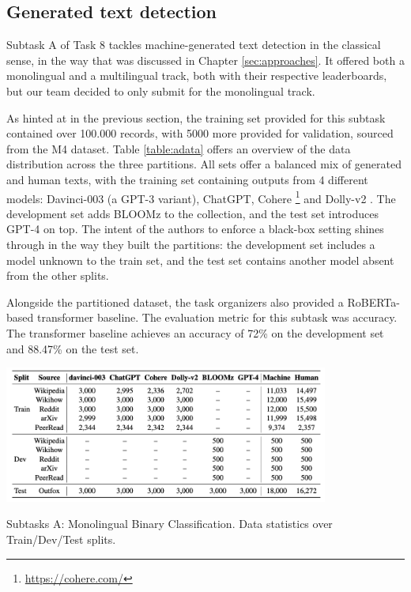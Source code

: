 \subsection{Generated text detection}
\label{subsec:subtask_a}

Subtask A of Task 8 tackles machine-generated text detection in the classical sense, in the way that was discussed in Chapter \ref{sec:approaches}.
It offered both a monolingual and a multilingual track, both with their respective leaderboards, but our team decided to only submit for the monolingual track.

As hinted at in the previous section, the training set provided for this subtask contained over 100.000 records, with 5000 more provided for validation, sourced from the M4 \citep{wang-etal-2024-m4} dataset.
Table \ref{table:adata} offers an overview of the data distribution across the three partitions.
All sets offer a balanced mix of generated and human texts, with the training set containing outputs from 4 different models: Davinci-003 (a GPT-3 variant), ChatGPT, Cohere \footnote{\url{https://cohere.com/}} and Dolly-v2 \citep{DatabricksBlog2023DollyV2}. The development set adds BLOOMz \citep{muennighoff2023crosslingualgeneralizationmultitaskfinetuning} to the collection, and the test set introduces GPT-4 on top.
The intent of the authors to enforce a black-box setting shines through in the way they built the partitions: the development set includes a model unknown to the train set, and the test set contains another model absent from the other splits.

Alongside the partitioned dataset, the task organizers also provided a RoBERTa-based transformer baseline.
The evaluation metric for this subtask was accuracy.
The transformer baseline achieves an accuracy of 72\% on the development set and 88.47\% on the test set.

\begin{table}[ht]
    \centering
    \includegraphics[width=0.8\textwidth]{assets/subtaska-data.png}
    \caption{Subtasks A: Monolingual Binary Classification. Data statistics over Train/Dev/Test splits.}
    \label{table:adata}
\end{table}

